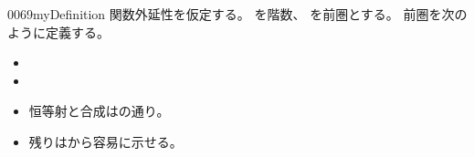 \documentclass[index]{subfiles}
\begin{document}
\begin{myBlock}{0069}{myDefinition}
  関数外延性を仮定する。
  を階数、
  を前圏とする。
  前圏を次のように定義する。
  \begin{itemize}
  \item {}
  \item {}
  \item 恒等射と合成はの通り。
  \item 残りはから容易に示せる。
  \end{itemize}
\end{myBlock}
\end{document}
